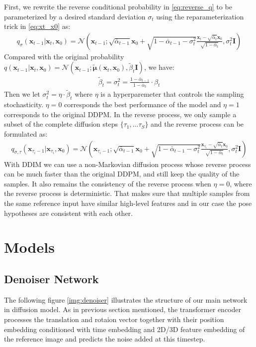 \documentclass[12pt,DIV14,BCOR12mm,a4paper,footinclude=false,headinclude,parskip=half-,twoside,openright,cleardoublepage=empty,toc=index,bibliography=totoc,listof=totoc]{scrreprt}
\numberwithin{equation}{chapter}
\begin{document}
First, we rewrite the reverse conditional probability in \ref{eq:reverse_q} to be parameterized by a desired standard deviation $\sigma_{t}$ using the reparameterization trick in \ref{eq:xt_x0} as:
\begin{align}
  q_{\sigma}(\mathbf{x}_{t-1}|\mathbf{x}_{t},\mathbf{x}_{0}) = \mathcal{N} (\mathbf{x}_{t-1}; \sqrt{\bar{\alpha}_{t-1}}\mathbf{x}_{0}+\sqrt{1-\bar{\alpha}_{t-1} - \sigma_{t}^{2}}\frac{\mathbf{x}_{t}-\sqrt{\bar{\alpha}_{t}}\mathbf{x}_{0}}{\sqrt{1-\bar{\alpha}_{t}}}, \sigma_{t}^{2}\mathbf{I})
\end{align}
Compared with the original probability $q(\mathbf{x}_{t-1}|\mathbf{x}_{t},\mathbf{x}_{0}) = \mathcal{N} (\mathbf{x}_{t-1}; \boldsymbol{\tilde{\mu}}(\mathbf{x}_{t}, \mathbf{x}_{0}), \tilde{\beta}_{t}\mathbf{I})$, we have:
\begin{align}
  \tilde{\beta}_{t}=\sigma_{t}^{2}=\frac{1-\bar{\alpha}_{t-1}}{1-\bar{\alpha}_{t}}\cdot\beta_{t}
\end{align}
Then we let $\sigma_{t}^{2}=\eta\cdot\tilde{\beta}_{t}$ where $\eta$ is a hyperparemeter that controls the sampling stochasticity. $\eta=0$ corresponds the best performance of the model and $\eta=1$ corresponds to the original DDPM. In the reverse process, we only sample a subset of the complete diffusion steps $\{\tau_{1},...\tau_{S}\}$ and the reverse process can be formulated as:
\begin{align}
  q_{\sigma,\tau}(\mathbf{x}_{\tau_{i}-1}|\mathbf{x}_{\tau_{i}},\mathbf{x}_{0}) = \mathcal{N} (\mathbf{x}_{\tau_{i}-1}; \sqrt{\bar{\alpha}_{t-1}}\mathbf{x}_{0}+\sqrt{1-\bar{\alpha}_{t-1} - \sigma_{t}^{2}}\frac{\mathbf{x}_{\tau_{i}}-\sqrt{\bar{\alpha}_{t}}\mathbf{x}_{0}}{\sqrt{1-\bar{\alpha}_{t}}}, \sigma_{t}^{2}\mathbf{I})
\end{align}
With DDIM we can use a non-Markovian diffusion process whose reverse process can be much faster than the original DDPM, and still keep the quality of the samples. It also remains the consistency of the reverse process when $\eta=0$, where the reverse process is deterministic. That makes sure that multiple samples from the same reference input have similar high-level features and in our case the pose hypotheses are consistent with each other.
\section{Models}
\subsection{Denoiser Network}
The following figure \ref{img:denoiser} illustrates the structure of our main network in diffusion model. As in previous section mentioned, the transformer encoder processes the translation and rotaion vector together with their position embedding conditioned with time embedding and 2D/3D feature embedding of the reference image and predicts the noise added at this timestep. 
\end{document}
